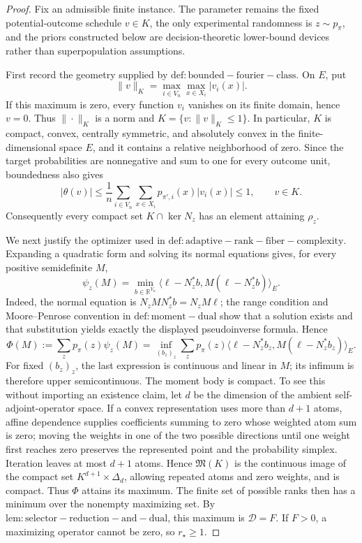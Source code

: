 \documentclass{article}
\begin{document}
\begin{proof}
Fix an admissible finite instance. The parameter remains the fixed potential-outcome schedule \(v\in K\), the only experimental randomness is \(z\sim p_{\pi}\), and the priors constructed below are decision-theoretic lower-bound devices rather than superpopulation assumptions.

First record the geometry supplied by \(\mathrm{def:bounded-fourier-class}\). On \(E\), put
\[
 \|v\|_K=\max_{i\in V_n}\max_{x\in X_i}|v_i(x)|.
\]
If this maximum is zero, every function \(v_i\) vanishes on its finite domain, hence \(v=0\). Thus \(\|\cdot\|_K\) is a norm and \(K=\{v:\|v\|_K\le1\}\). In particular, \(K\) is compact, convex, centrally symmetric, and absolutely convex in the finite-dimensional space \(E\), and it contains a relative neighborhood of zero. Since the target probabilities are nonnegative and sum to one for every outcome unit, boundedness also gives
\[
 |\theta(v)|
 \le \frac1n\sum_{i\in V_n}\sum_{x\in X_i}p_{\pi',i}(x)|v_i(x)|
 \le1,
 \qquad v\in K.
\]
Consequently every compact set \(K\cap\ker N_z\) has an element attaining \(\rho_z\).

We next justify the optimizer used in \(\mathrm{def:adaptive-rank-fiber-complexity}\). Expanding a quadratic form and solving its normal equations gives, for every positive semidefinite \(M\),
\[
 \psi_z(M)
 =\min_{b\in\mathbb R^{V_n}}
 \langle\ell-N_z^{\ast}b,M(\ell-N_z^{\ast}b)\rangle_E.
\]
Indeed, the normal equation is \(N_zMN_z^{\ast}b=N_zM\ell\); the range condition and Moore--Penrose convention in \(\mathrm{def:moment-dual}\) show that a solution exists and that substitution yields exactly the displayed pseudoinverse formula. Hence
\[
 \Phi(M):=\sum_zp_{\pi}(z)\psi_z(M)
 =\inf_{(b_z)_z}\sum_zp_{\pi}(z)
 \langle\ell-N_z^{\ast}b_z,M(\ell-N_z^{\ast}b_z)\rangle_E.
\]
For fixed \((b_z)_z\), the last expression is continuous and linear in \(M\); its infimum is therefore upper semicontinuous. The moment body is compact. To see this without importing an existence claim, let \(d\) be the dimension of the ambient self-adjoint-operator space. If a convex representation uses more than \(d+1\) atoms, affine dependence supplies coefficients summing to zero whose weighted atom sum is zero; moving the weights in one of the two possible directions until one weight first reaches zero preserves the represented point and the probability simplex. Iteration leaves at most \(d+1\) atoms. Hence \(\mathfrak M(K)\) is the continuous image of the compact set \(K^{d+1}\times\Delta_d\), allowing repeated atoms and zero weights, and is compact. Thus \(\Phi\) attains its maximum. The finite set of possible ranks then has a minimum over the nonempty maximizing set. By \(\mathrm{lem:selector-reduction-and-dual}\), this maximum is \(\mathcal D=F\). If \(F>0\), a maximizing operator cannot be zero, so \(r_{\star}\ge1\).


\end{proof}
\end{document}
